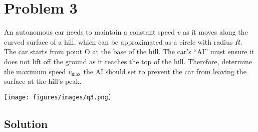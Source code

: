 \section*{Problem 3}

An autonomous car needs to maintain a constant speed \( v \) as it moves along the curved surface of a hill, which can be approximated as a circle with radius \( R \).
The car starts from point O at the base of the hill.
The car's ``AI'' must ensure it does not lift off the ground as it reaches the top of the hill.
Therefore, determine the maximum speed \( v_{\max} \) the AI should set to prevent the car from leaving the surface at the hill's peak.

\begin{figure*}[h]
    \centering
    \texttt{[image: figures/images/q3.png]}
\end{figure*}

\subsection*{Solution}
